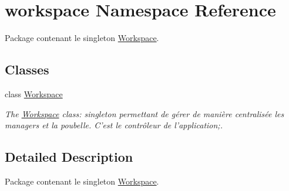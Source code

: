 \hypertarget{namespaceworkspace}{\section{workspace Namespace Reference}
\label{namespaceworkspace}
}


Package contenant le singleton \hyperlink{classworkspace_1_1_workspace}{Workspace}.  


\subsection*{Classes}
\begin{DoxyCompactItemize}
\item 
class \hyperlink{classworkspace_1_1_workspace}{Workspace}
\begin{DoxyCompactList}\small\item\em The \hyperlink{classworkspace_1_1_workspace}{Workspace} class\-: singleton permettant de gérer de manière centralisée les managers et la poubelle. C'est le contrôleur de l'application;. \end{DoxyCompactList}\end{DoxyCompactItemize}


\subsection{Detailed Description}
Package contenant le singleton \hyperlink{classworkspace_1_1_workspace}{Workspace}. 